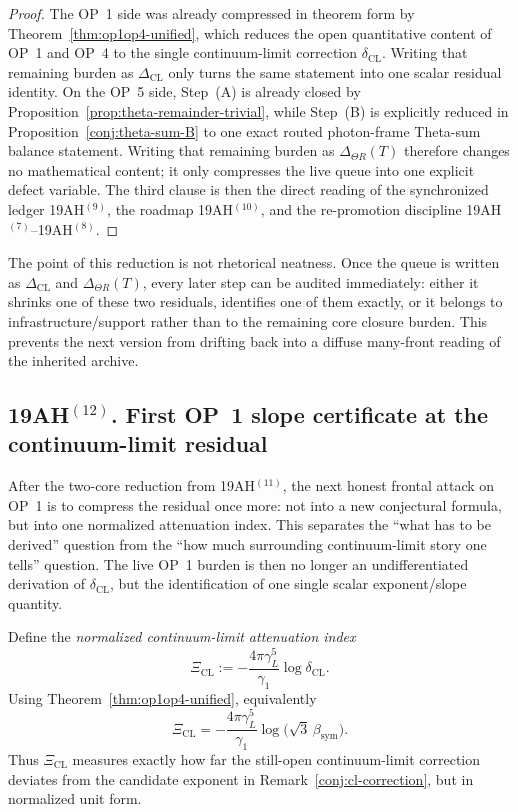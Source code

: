 \begin{proof}
The OP~1 side was already compressed in theorem form by Theorem~\ref{thm:op1op4-unified}, which reduces the open quantitative content of OP~1 and OP~4 to the single continuum-limit correction \(\delta_{\mathrm{CL}}\). Writing that remaining burden as \(\Delta_{\mathrm{CL}}\) only turns the same statement into one scalar residual identity. On the OP~5 side, Step~(A) is already closed by Proposition~\ref{prop:theta-remainder-trivial}, while Step~(B) is explicitly reduced in Proposition~\ref{conj:theta-sum-B} to one exact routed photon-frame Theta-sum balance statement. Writing that remaining burden as \(\Delta_{\Theta R}(T)\) therefore changes no mathematical content; it only compresses the live queue into one explicit defect variable. The third clause is then the direct reading of the synchronized ledger 19AH$^{(9)}$, the roadmap 19AH$^{(10)}$, and the re-promotion discipline 19AH$^{(7)}$--19AH$^{(8)}$.
\end{proof}

\begin{remark}
The point of this reduction is not rhetorical neatness. Once the queue is written as \(\Delta_{\mathrm{CL}}\) and \(\Delta_{\Theta R}(T)\), every later step can be audited immediately: either it shrinks one of these two residuals, identifies one of them exactly, or it belongs to infrastructure/support rather than to the remaining core closure burden. This prevents the next version from drifting back into a diffuse many-front reading of the inherited archive.
\end{remark}


\subsection*{19AH$^{(12)}$. First OP~1 slope certificate at the continuum-limit residual}
After the two-core reduction from 19AH$^{(11)}$, the next honest frontal attack on OP~1 is to compress the residual once more: not into a new conjectural formula, but into one normalized attenuation index. This separates the ``what has to be derived'' question from the ``how much surrounding continuum-limit story one tells'' question. The live OP~1 burden is then no longer an undifferentiated derivation of \(\delta_{\mathrm{CL}}\), but the identification of one single scalar exponent/slope quantity.

\begin{definition}
\label{def:xi-cl}
Define the \emph{normalized continuum-limit attenuation index}
\[
  \Xi_{\mathrm{CL}}
  :=
  -\frac{4\pi\gamma_L^5}{\gamma_1}\log \delta_{\mathrm{CL}}.
\]
Using Theorem~\ref{thm:op1op4-unified}, equivalently
\[
  \Xi_{\mathrm{CL}}
  =
  -\frac{4\pi\gamma_L^5}{\gamma_1}\log\!\bigl(\sqrt{3}\,\beta_{\mathrm{sym}}\bigr).
\]
Thus \(\Xi_{\mathrm{CL}}\) measures exactly how far the still-open continuum-limit correction deviates from the candidate exponent in Remark~\ref{conj:cl-correction}, but in normalized unit form.
\end{definition}

